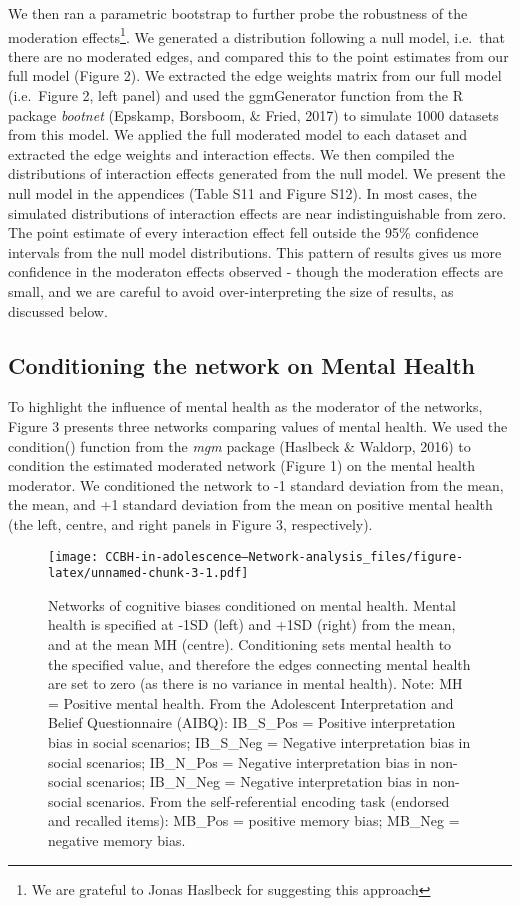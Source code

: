 \documentclass[
  english,
  man]{apa6}
\begin{document}
We then ran a parametric bootstrap to further probe the robustness of the moderation effects\footnote{We are grateful to Jonas Haslbeck for suggesting this approach}. We generated a distribution following a null model, i.e.~that there are no moderated edges, and compared this to the point estimates from our full model (Figure 2). We extracted the edge weights matrix from our full model (i.e.~Figure 2, left panel) and used the ggmGenerator function from the R package \emph{bootnet} (Epskamp, Borsboom, \& Fried, 2017) to simulate 1000 datasets from this model. We applied the full moderated model to each dataset and extracted the edge weights and interaction effects. We then compiled the distributions of interaction effects generated from the null model. We present the null model in the appendices (Table S11 and Figure S12). In most cases, the simulated distributions of interaction effects are near indistinguishable from zero. The point estimate of every interaction effect fell outside the 95\% confidence intervals from the null model distributions. This pattern of results gives us more confidence in the moderaton effects observed - though the moderation effects are small, and we are careful to avoid over-interpreting the size of results, as discussed below.

\hypertarget{conditioning-the-network-on-mental-health}{%
\subsection{Conditioning the network on Mental Health}\label{conditioning-the-network-on-mental-health}}

To highlight the influence of mental health as the moderator of the networks, Figure 3 presents three networks comparing values of mental health. We used the condition() function from the \emph{mgm} package (Haslbeck \& Waldorp, 2016) to condition the estimated moderated network (Figure 1) on the mental health moderator. We conditioned the network to -1 standard deviation from the mean, the mean, and +1 standard deviation from the mean on positive mental health (the left, centre, and right panels in Figure 3, respectively).

\begin{figure}
\centering
\texttt{[image: CCBH-in-adolescence---Network-analysis\_files/figure-latex/unnamed-chunk-3-1.pdf]}
\caption{\label{fig:unnamed-chunk-3}Networks of cognitive biases conditioned on mental health. Mental health is specified at -1SD (left) and +1SD (right) from the mean, and at the mean MH (centre). Conditioning sets mental health to the specified value, and therefore the edges connecting mental health are set to zero (as there is no variance in mental health).
Note: MH = Positive mental health. From the Adolescent Interpretation and Belief Questionnaire (AIBQ): IB\_S\_Pos = Positive interpretation bias in social scenarios; IB\_S\_Neg = Negative interpretation bias in social scenarios; IB\_N\_Pos = Negative interpretation bias in non-social scenarios; IB\_N\_Neg = Negative interpretation bias in non-social scenarios. From the self-referential encoding task (endorsed and recalled items): MB\_Pos = positive memory bias; MB\_Neg = negative memory bias.}
\end{figure}
\end{document}
